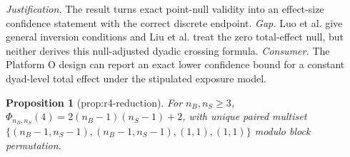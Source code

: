 \documentclass{article}
\newtheorem{proposition}{Proposition}
\begin{document}
\par\smallskip\noindent \textit{Justification.} The result turns exact point-null validity into an effect-size confidence statement with the correct discrete endpoint. \textit{Gap.} Luo et al. give general inversion conditions and Liu et al. treat the zero total-effect null, but neither derives this null-adjusted dyadic crossing formula. \textit{Consumer.} The Platform O design can report an exact lower confidence bound for a constant dyad-level total effect under the stipulated exposure model.

\begin{proposition}[prop:r4-reduction]\label{prop:r4-reduction}
For \(n_B,n_S\ge3\), \(\Phi_{n_B,n_S}(4)=2(n_B-1)(n_S-1)+2\), with unique paired multiset \(\{(n_B-1,n_S-1),(n_B-1,n_S-1),(1,1),(1,1)\}\) modulo block permutation.
\end{proposition}
\end{document}

